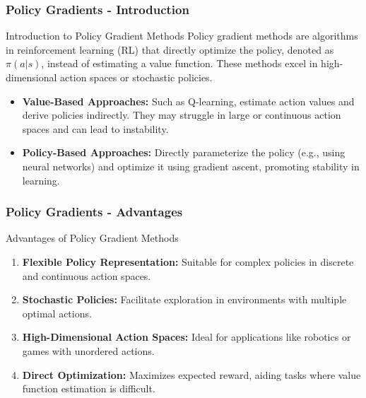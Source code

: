 \documentclass[aspectratio=169]{beamer}
\begin{document}
\begin{frame}[fragile]
    \frametitle{Policy Gradients - Introduction}
    \begin{block}{Introduction to Policy Gradient Methods}
        Policy gradient methods are algorithms in reinforcement learning (RL) that directly optimize the policy, denoted as $\pi(a|s)$, instead of estimating a value function. These methods excel in high-dimensional action spaces or stochastic policies.
    \end{block}
    
    \begin{itemize}
        \item \textbf{Value-Based Approaches:} Such as Q-learning, estimate action values and derive policies indirectly. They may struggle in large or continuous action spaces and can lead to instability.
        
        \item \textbf{Policy-Based Approaches:} Directly parameterize the policy (e.g., using neural networks) and optimize it using gradient ascent, promoting stability in learning.
    \end{itemize}
\end{frame}

\begin{frame}[fragile]
    \frametitle{Policy Gradients - Advantages}
    \begin{block}{Advantages of Policy Gradient Methods}
        \begin{enumerate}
            \item \textbf{Flexible Policy Representation:} Suitable for complex policies in discrete and continuous action spaces.
            \item \textbf{Stochastic Policies:} Facilitate exploration in environments with multiple optimal actions.
            \item \textbf{High-Dimensional Action Spaces:} Ideal for applications like robotics or games with unordered actions.
            \item \textbf{Direct Optimization:} Maximizes expected reward, aiding tasks where value function estimation is difficult.
        \end{enumerate}
    \end{block}
\end{frame}
\end{document}
